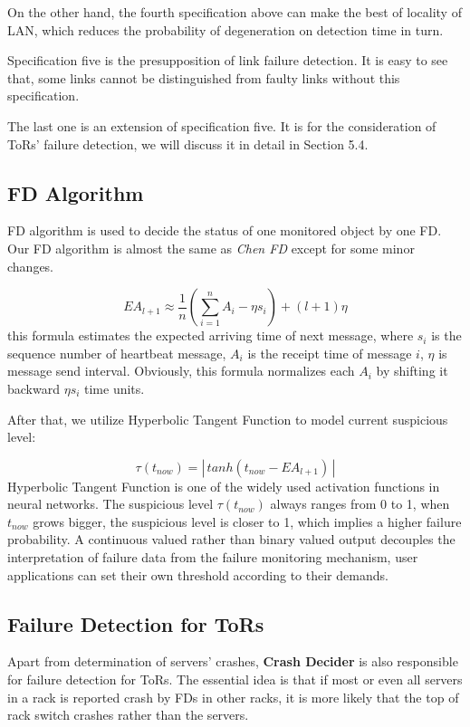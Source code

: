 \documentclass{sig-alternate-05-2015}
\begin{document}
On the other hand, the fourth specification above can make the best of locality of LAN, which reduces the probability of degeneration on detection time in turn.

Specification five is the presupposition of link failure detection. It is easy to see that, some links cannot be distinguished from faulty links without this specification.

The last one is an extension of specification five. It is for the consideration of ToRs' failure detection, we will discuss it in detail in Section 5.4.

\subsection{FD Algorithm}
FD algorithm is used to decide the status of one monitored object by one FD. Our FD algorithm is almost the same as \textit{Chen FD} \cite{chen2002quality} except for some minor changes.

\begin{equation}
EA_{l+1} \approx \frac{1}{n}(\sum_{i=1}^{n}A_i - \eta s_i)+(l+1)\eta
\end{equation}
this formula estimates the expected arriving time of next message, where $s_i$ is the sequence number of heartbeat message, $A_i$ is the receipt time of message $i$, $\eta$ is message send interval. Obviously, this formula normalizes each $A_i$ by shifting it backward $\eta s_i$ time units.

After that, we utilize Hyperbolic Tangent Function to model current suspicious level:

\begin{equation}
\tau(t_{now}) = |\,tanh(t_{now}-EA_{l+1})\,|
\end{equation}
Hyperbolic Tangent Function is one of the widely used activation functions in neural networks. The suspicious level $\tau(t_{now})$ always ranges from 0 to 1, when $t_{now}$ grows bigger, the suspicious level is closer to 1, which implies a higher failure probability. A continuous valued rather than binary valued output decouples the interpretation of failure data from the failure monitoring mechanism, user applications can set their own threshold according to their demands.

\subsection{Failure Detection for ToRs}
Apart from determination of servers' crashes, \textbf{Crash Decider} is also responsible for failure detection for ToRs. The essential idea is that if most or even all servers in a rack is reported crash by FDs in other racks, it is more likely that the top of rack switch crashes rather than the servers.
\end{document}
